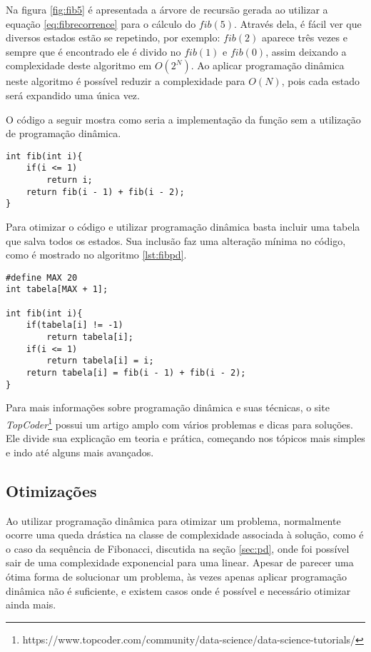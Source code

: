 Na figura \ref{fig:fib5} é apresentada a árvore de recursão gerada ao utilizar a equação \ref{eq:fibrecorrence} para o cálculo do $fib(5)$. Através dela, é fácil ver que diversos estados estão se repetindo, por exemplo: $fib(2)$ aparece três vezes e sempre que é encontrado ele é divido no $fib(1)$ e $fib(0)$, assim deixando a  complexidade deste algoritmo em $O(2^{N})$. Ao aplicar programação dinâmica neste algoritmo é possível reduzir a complexidade para $O(N)$, pois cada estado será expandido uma única vez.

O código a seguir mostra como seria a implementação da função sem a utilização de programação dinâmica.
\begin{lstlisting}[caption={Implementação Fibonacci sem programação dinâmica},label={lst:fibsimples}]
int fib(int i){
	if(i <= 1)
		return i;
	return fib(i - 1) + fib(i - 2);
}

\end{lstlisting}

Para otimizar o código e utilizar programação dinâmica basta incluir uma tabela que salva todos os estados. Sua inclusão faz uma alteração mínima no código, como é mostrado no algoritmo \ref{lst:fibpd}.


\begin{lstlisting}[caption={Implementação Fibonacci com programação dinâmica},label={lst:fibpd}]
#define MAX 20 
int tabela[MAX + 1]; 
					 					 
int fib(int i){
	if(tabela[i] != -1) 
		return tabela[i];
	if(i <= 1)
		return tabela[i] = i;
	return tabela[i] = fib(i - 1) + fib(i - 2);
}
\end{lstlisting}

Para mais informações sobre programação dinâmica e suas técnicas, o site \textit{TopCoder}\footnote{https://www.topcoder.com/community/data-science/data-science-tutorials/} possui um artigo amplo com vários problemas e dicas para soluções. Ele divide sua explicação em teoria e prática, começando nos tópicos mais simples e indo até alguns mais avançados.

\subsection{Otimizações}

Ao utilizar programação dinâmica para otimizar um problema, normalmente ocorre uma queda drástica na classe de complexidade associada à solução, como é o caso da sequência de Fibonacci, discutida na seção \ref{sec:pd}, onde foi possível sair de uma complexidade exponencial para uma linear. Apesar de parecer uma ótima forma de solucionar um problema, às vezes apenas aplicar programação dinâmica não é suficiente, e existem casos onde é possível e necessário otimizar ainda mais.

